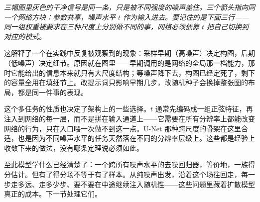 \begin{center}
\emph{三幅图里灰色的干净信号是同一条，只是被不同强度的噪声盖住。三个箭头指向同一个网络方块：参数共享，噪声水平 \(t\) 作为输入进去。要记住的是下面三行——同一组权重被要求在三种尺度上分别做不同的事，网络必须依靠 \(t\) 把自己切换到对应的模式。}

\end{center}

这解释了一个在实践中反复被观察到的现象：采样早期（高噪声）决定构图，后期（低噪声）决定细节。原因就在图里——早期调用的是网络的全局那一档能力，那时它能给出的信息本来就只有大尺度结构；等噪声降下去，构图已经定死了，剩下的容量全用在填细节上。改提示词只影响早期几步，改随机种子会换掉整张图的布局，都是同一件事的表现。

这个多任务的性质也决定了架构上的一些选择。\(t\) 通常先编码成一组正弦特征，再注入到网络的每一层，而不是拼在输入通道上——它需要在所有分辨率上都能改变网络的行为，只在入口喂一次做不到这一点。U-Net 那种跨尺度的骨架在这里合适，也是因为不同噪声水平的任务天然落在不同的分辨率层级上。这些都是经验上收敛下来的做法，没有哪条定理说必须如此。

至此模型学什么已经清楚了：一个跨所有噪声水平的去噪回归器，等价地，一族得分估计。但有了得分场不等于有了样本。从纯噪声出发，沿着这个场往回走，每一步走多远、走多少步、要不要在中途继续注入随机性——这些问题里藏着扩散模型真正的成本。下一节处理它们。
